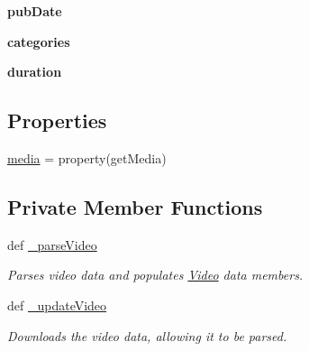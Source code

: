 \begin{DoxyCompactItemize}
\item 
\hypertarget{class_sbs_on_demand_1_1_video_1_1_video_a9184a015e3f3ab806849276dddad3a11}{
{\bfseries pub\-Date}}
\label{class_sbs_on_demand_1_1_video_1_1_video_a9184a015e3f3ab806849276dddad3a11}

\item 
\hypertarget{class_sbs_on_demand_1_1_video_1_1_video_a5937a95f163e163415ca70153575cf90}{
{\bfseries categories}}
\label{class_sbs_on_demand_1_1_video_1_1_video_a5937a95f163e163415ca70153575cf90}

\item 
\hypertarget{class_sbs_on_demand_1_1_video_1_1_video_ad41a6df429f454b9095b0387dbc46df4}{
{\bfseries duration}}
\label{class_sbs_on_demand_1_1_video_1_1_video_ad41a6df429f454b9095b0387dbc46df4}

\end{DoxyCompactItemize}
\subsection*{\-Properties}
\begin{DoxyCompactItemize}
\item 
\hyperlink{class_sbs_on_demand_1_1_video_1_1_video_adc7a5dd47db630b8dd3b80b2b0dddd87}{media} = property(get\-Media)
\end{DoxyCompactItemize}
\subsection*{\-Private \-Member \-Functions}
\begin{DoxyCompactItemize}
\item 
def \hyperlink{class_sbs_on_demand_1_1_video_1_1_video_a6351378c351e51c11d2270070f4b4327}{\-\_\-parse\-Video}
\begin{DoxyCompactList}\small\item\em \-Parses video data and populates \hyperlink{class_sbs_on_demand_1_1_video_1_1_video}{\-Video} data members. \end{DoxyCompactList}\item 
\hypertarget{class_sbs_on_demand_1_1_video_1_1_video_a3dfda5834f662c50dbc0eff469b98312}{
def \hyperlink{class_sbs_on_demand_1_1_video_1_1_video_a3dfda5834f662c50dbc0eff469b98312}{\-\_\-update\-Video}}
\label{class_sbs_on_demand_1_1_video_1_1_video_a3dfda5834f662c50dbc0eff469b98312}

\begin{DoxyCompactList}\small\item\em \-Downloads the video data, allowing it to be parsed. \end{DoxyCompactList}\end{DoxyCompactItemize}

